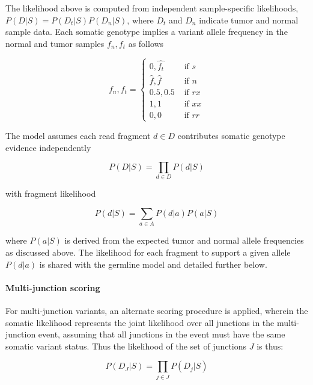 \documentclass{article}
\begin{document}
The likelihood above is computed from independent sample-specific likelihoods, $P( D \vert S ) = P( D_t \vert S )P( D_n \vert S )$, where $D_t$ and $D_n$ indicate tumor and normal sample data. Each somatic genotype implies a variant allele frequency in the normal and tumor samples $f_n,f_t$ as follows

\begin{equation*}
f_n, f_t =
\left\{
\begin{array}{rl}
0, \hat{f_t} & \mbox{ if $s$} \\
\hat{f}, \hat{f} & \mbox{ if $n$} \\
0.5, 0.5 & \mbox{ if $rx$} \\
1, 1 & \mbox{ if $xx$} \\
0, 0 & \mbox{ if $rr$}
\end{array}
\right.
\end{equation*}

The model assumes each read fragment $d \in D$ contributes somatic genotype evidence independently

\begin{equation*}
P(D \vert S) = \prod_{d \in D} P(d \vert S)
\end{equation*}

\noindent
with fragment likelihood

\begin{equation*}
P(d \vert S) = \sum_{a \in A} P(d \vert a) P(a | S)
\end{equation*}

\noindent
where $P(a|S)$ is derived from the expected tumor and normal allele frequencies as discussed above. The likelihood for each fragment to support a given allele $P(d \vert a)$ is shared with the germline model and detailed further below.

\paragraph{Multi-junction scoring}

For multi-junction variants, an alternate scoring procedure is applied, wherein the somatic likelihood represents the joint likelihood over all junctions in the multi-junction event, assuming that all junctions in the event must have the same somatic variant status. Thus the likelihood of the set of junctions $J$ is thus:

\begin{equation*}
P(D_{J} \vert S) = \prod_{j \in J} P(D_{j} \vert S)
\end{equation*}
\end{document}
